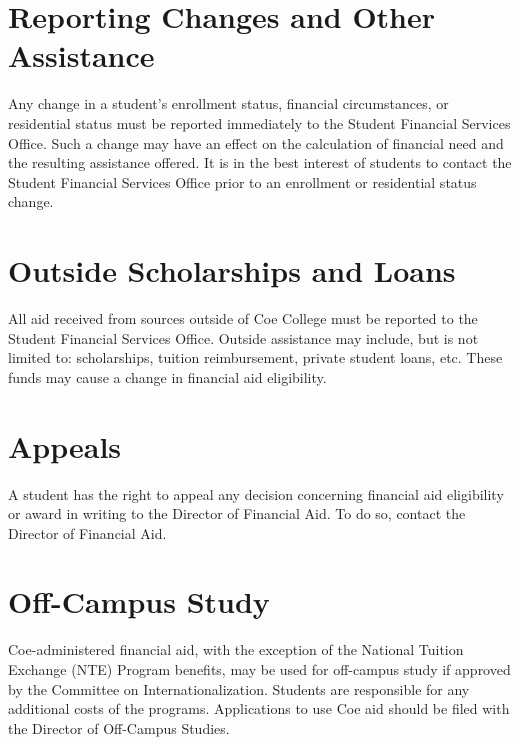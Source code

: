 \documentclass[
  letterpaper,
]{scrbook}
\begin{document}
\section{\texorpdfstring{\textbf{Reporting Changes and Other
Assistance}}{Reporting Changes and Other Assistance}}\label{reporting-changes-and-other-assistance}

Any change in a student's enrollment status, financial circumstances, or
residential status must be reported immediately to the Student Financial
Services Office. Such a change may have an effect on the calculation of
financial need and the resulting assistance offered. It is in the best
interest of students to contact the Student Financial Services Office
prior to an enrollment or residential status change.

\section{\texorpdfstring{\textbf{Outside Scholarships and
Loans}}{Outside Scholarships and Loans}}\label{outside-scholarships-and-loans}

All aid received from sources outside of Coe College must be reported to
the Student Financial Services Office. Outside assistance may include,
but is not limited to: scholarships, tuition reimbursement, private
student loans, etc. These funds may cause a change in financial aid
eligibility.

\section{\texorpdfstring{\textbf{Appeals}}{Appeals}}\label{appeals}

A student has the right to appeal any decision concerning financial aid
eligibility or award in writing to the Director of Financial Aid. To do
so, contact the Director of Financial Aid.

\section{\texorpdfstring{\textbf{Off-Campus
Study}}{Off-Campus Study}}\label{off-campus-study-1}

Coe-administered financial aid, with the exception of the National
Tuition Exchange (NTE) Program benefits, may be used for off-campus
study if approved by the Committee on Internationalization. Students are
responsible for any additional costs of the programs. Applications to
use Coe aid should be filed with the Director of Off-Campus Studies.
\end{document}
